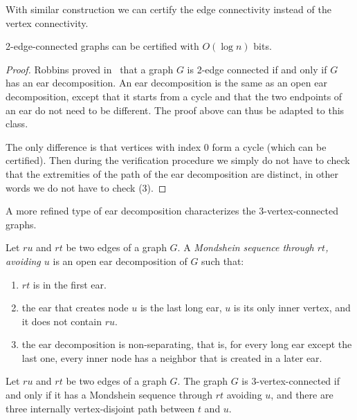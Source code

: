 \documentclass[a4paper,thm-restate,USenglish]{lipics-v2019}
\begin{document}
With similar construction we can certify the edge connectivity instead of the vertex connectivity.

\begin{corollary}\label{coro:2-edge-connected}
2-edge-connected graphs can be certified with $O(\log n)$ bits.
\end{corollary}

\begin{proof}
Robbins proved in~\cite{Robbins39} that a graph $G$ is 2-edge connected if and only if $G$ has an ear decomposition. 
An ear decomposition is the same as an open ear decomposition, except that it starts from a cycle and that the two endpoints of an ear do not need to be different.
The proof above can thus be adapted to this class.

The only difference is that vertices with index $0$ form a cycle (which can be certified). 
Then during the verification procedure we simply do not have to check that the extremities of the path of the ear decomposition are distinct, in other words we do not have to check (3).
\end{proof}

A more refined type of ear decomposition characterizes the 3-vertex-connected graphs.

\begin{definition}
Let $ru$ and $rt$ be two edges of a graph $G$. A \emph{Mondshein sequence through $rt$, avoiding $u$} is an open ear decomposition of $G$ such that:
\begin{enumerate}
    \item $rt$ is in the first ear.
    \item the ear that creates node $u$ is the last long ear, $u$ is its only inner vertex, and it does not contain $ru$.
    \item the ear decomposition is non-separating, that is, for every long ear except the last one, every inner node has a neighbor that is created in a later ear.
\end{enumerate}
\end{definition}

\begin{theorem}
Let $ru$ and $rt$ be two edges of a graph $G$. 
The graph $G$ is 3-vertex-connected if and only if it has a Mondshein sequence through $rt$ avoiding $u$, and there are three internally vertex-disjoint path between $t$ and $u$.
\end{theorem}
\end{document}
